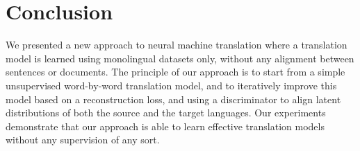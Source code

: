 \documentclass{article} \usepackage{iclr2018_conference,times}
\begin{document}
  \section{Conclusion} \label{sec:conclusion}


We presented a new approach to neural machine translation where a translation model is learned using monolingual datasets only, without any alignment between sentences or documents. The principle of our approach is to start from a simple unsupervised word-by-word translation model, and to iteratively improve this model based on a reconstruction loss, and using a discriminator to align latent distributions of both the source and the target languages. Our experiments demonstrate that our approach is able to learn effective translation models without any supervision of any sort.

 










\end{document}
